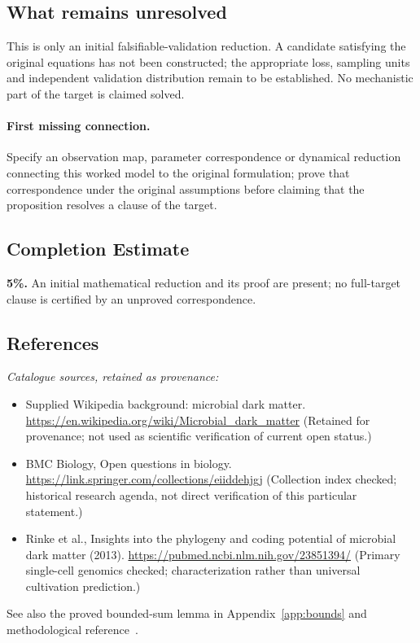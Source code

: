 \documentclass[11pt]{article}
\begin{document}
\subsection{What remains unresolved}
This is only an initial falsifiable-validation reduction. A candidate satisfying the original equations has not been constructed; the appropriate loss, sampling units and independent validation distribution remain to be established. No mechanistic part of the target is claimed solved.
\paragraph{First missing connection.} Specify an observation map, parameter correspondence or dynamical reduction connecting this worked model to the original formulation; prove that correspondence under the original assumptions before claiming that the proposition resolves a clause of the target.
\subsection{Completion Estimate}
\textbf{5\%.} An initial mathematical reduction and its proof are present; no full-target clause is certified by an unproved correspondence.
\subsection{References}
\noindent\emph{Catalogue sources, retained as provenance:}
\begin{itemize}
\item Supplied Wikipedia background: microbial dark matter. \url{https://en.wikipedia.org/wiki/Microbial_dark_matter} (Retained for provenance; not used as scientific verification of current open status.)
\item BMC Biology, Open questions in biology. \url{https://link.springer.com/collections/eiiddehjgj} (Collection index checked; historical research agenda, not direct verification of this particular statement.)
\item Rinke et al., Insights into the phylogeny and coding potential of microbial dark matter (2013). \url{https://pubmed.ncbi.nlm.nih.gov/23851394/} (Primary single-cell genomics checked; characterization rather than universal cultivation prediction.)
\end{itemize}
\noindent See also the proved bounded-sum lemma in Appendix~\ref{app:bounds} and methodological reference~\cite{hoeffding}.
\clearpage


\appendix
\end{document}
